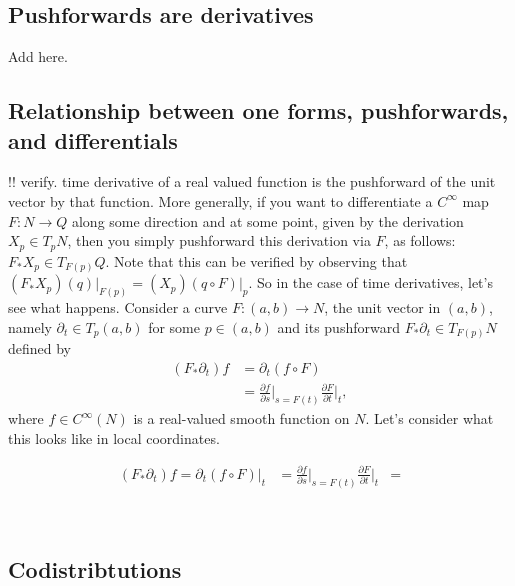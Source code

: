 \documentclass[psamsfonts]{amsart}
\theoremstyle{definition}
\theoremstyle{remark}
\numberwithin{equation}{section}
\begin{document}
\subsection{Pushforwards are derivatives}
Add here. 
\subsection{Relationship between one forms, pushforwards, and differentials}



{\color{blue} !! verify. time derivative of a real valued function is the pushforward of the unit vector by that function. More generally, if you want to differentiate a $C^{\infty}$ map $F:N \rightarrow Q$ along some direction and at some point, given by the derivation $X_p \in T_pN$, then you simply pushforward this derivation via $F$, as follows: $F_* X_p \in T_{F(p)}Q$. Note that this can be verified by observing that $(F_*X_p)(q)\bigr|_{F(p)} = (X_p)(q\circ F)\bigr|_{p}$. So in the case of time derivatives, let's see what happens. 
Consider a curve $F:(a, b) \rightarrow N$, the unit vector in $(a,b)$, namely $\partial_t\in T_p(a,b)$ for some $p \in (a, b)$ and its pushforward $F_*\partial_t \in T_{F(p)}N$ defined by 
\begin{align}
\left(F_* \partial_t \right)f & =  \partial_t (f\circ F)\\
& = \frac{\partial f}{\partial s}\biggr|_{s=F(t)}\frac{\partial F}{\partial t}\biggr|_{t},
\end{align}
where $f\in C^{\infty}(N)$ is a real-valued smooth function on $N$. Let's consider what this looks like in local coordinates. 

\begin{align}
\left(F_* \partial_t \right)f = \partial_t (f\circ F)\biggr|_t & = \frac{\partial f}{\partial s}\biggr|_{s=F(t)}\frac{\partial F}{\partial t}\biggr|_{t}
& =  
\end{align}
  }\\ 

  \subsection{Codistribtutions}




\end{document}
